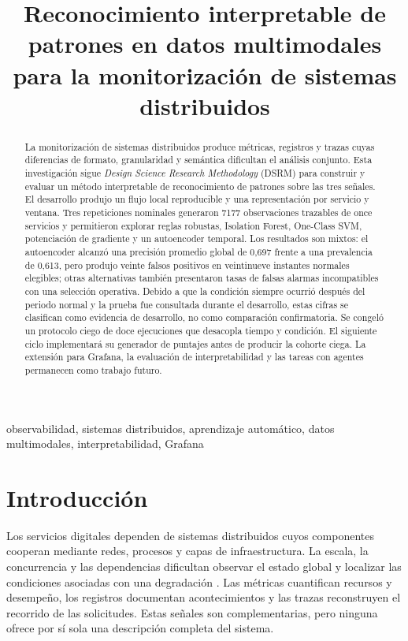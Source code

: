 \documentclass[conference]{IEEEtran}
\title{Reconocimiento interpretable de patrones en datos multimodales para la monitorización de sistemas distribuidos}
\author{
\IEEEauthorblockN{Nombre del autor}
\IEEEauthorblockA{
Nombre de la institución\\
Ciudad, Colombia\\
correo@institucion.edu.co}
}
\begin{document}
\maketitle

\begin{abstract}
La monitorización de sistemas distribuidos produce métricas, registros y trazas cuyas diferencias de formato, granularidad y semántica dificultan el análisis conjunto. Esta investigación sigue \textit{Design Science Research Methodology} (DSRM) para construir y evaluar un método interpretable de reconocimiento de patrones sobre las tres señales. El desarrollo produjo un flujo local reproducible y una representación por servicio y ventana. Tres repeticiones nominales generaron 7177 observaciones trazables de once servicios y permitieron explorar reglas robustas, Isolation Forest, One-Class SVM, potenciación de gradiente y un autoencoder temporal. Los resultados son mixtos: el autoencoder alcanzó una precisión promedio global de 0,697 frente a una prevalencia de 0,613, pero produjo veinte falsos positivos en veintinueve instantes normales elegibles; otras alternativas también presentaron tasas de falsas alarmas incompatibles con una selección operativa. Debido a que la condición siempre ocurrió después del periodo normal y la prueba fue consultada durante el desarrollo, estas cifras se clasifican como evidencia de desarrollo, no como comparación confirmatoria. Se congeló un protocolo ciego de doce ejecuciones que desacopla tiempo y condición. El siguiente ciclo implementará su generador de puntajes antes de producir la cohorte ciega. La extensión para Grafana, la evaluación de interpretabilidad y las tareas con agentes permanecen como trabajo futuro.
\end{abstract}

\begin{IEEEkeywords}
observabilidad, sistemas distribuidos, aprendizaje automático, datos multimodales, interpretabilidad, Grafana
\end{IEEEkeywords}

\section{Introducción}

Los servicios digitales dependen de sistemas distribuidos cuyos componentes cooperan mediante redes, procesos y capas de infraestructura. La escala, la concurrencia y las dependencias dificultan observar el estado global y localizar las condiciones asociadas con una degradación \cite{ref1,ref10}. Las métricas cuantifican recursos y desempeño, los registros documentan acontecimientos y las trazas reconstruyen el recorrido de las solicitudes. Estas señales son complementarias, pero ninguna ofrece por sí sola una descripción completa del sistema.
\end{document}
